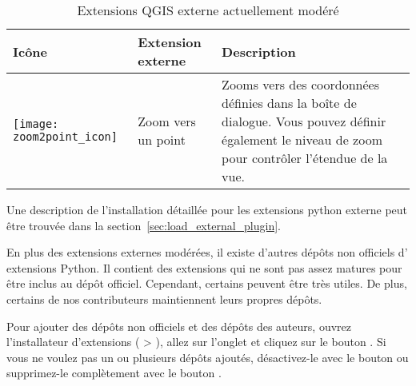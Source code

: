 \begin{table}[H]
\centering
\caption{Extensions QGIS externe actuellement modéré}\label{tab:external_plugins}\medskip
\small
 \begin{tabular}{|l|l|p{4in}|}
\hline \textbf{Icône} & \textbf{Extension externe} & \textbf{Description}\\
\hline
\texttt{[image: zoom2point\_icon]}
 & Zoom vers un point \index{plugins!Zoom vers un point} & Zooms vers des 
 coordonnées définies dans la boîte de dialogue. Vous pouvez définir également le
 niveau de zoom pour contrôler l'étendue de la vue.\\
\hline
\end{tabular}
\end{table}

Une description de l'installation détaillée pour les extensions python externe 
peut être trouvée dans la section~\ref{sec:load_external_plugin}.


En plus des extensions externes modérées, il existe d'autres dépôts non officiels d'
extensions Python. Il contient des extensions qui ne sont pas assez matures pour être
inclus au dépôt officiel. Cependant, certains peuvent être très utiles. De plus,
certains de nos contributeurs maintiennent leurs propres dépôts.

Pour ajouter des dépôts non officiels et des dépôts des auteurs, ouvrez
l'installateur d'extensions ( >
), allez sur
l'onglet  et cliquez sur le bouton  . Si vous ne voulez pas un ou plusieurs dépôts ajoutés,
désactivez-le avec le bouton   ou supprimez-le complètement
avec le bouton .


